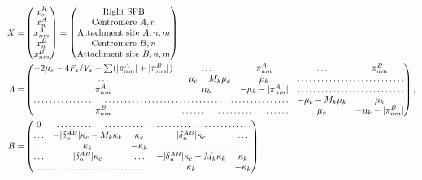 \documentclass[a4paper,12pt]{article}
\begin{document}
\begin{equation}
  \begin{aligned}
    X = &%
    \begin{pmatrix}
      x_s^R\\
      x_n^A\\
      x_{nm}^A\\
      x_n^B\\
      x_{nm}^B\\
    \end{pmatrix} =%
    \begin{pmatrix}
      \text{Right SPB}\\
      \text{Centromere }A, n\\
      \text{Attachment site }A, n,m\\
      \text{Centromere }B, n\\
      \text{Attachment site }B, n,m\\
    \end{pmatrix}\\
    A = &%
    \begin{pmatrix}
      - 2 \mu_s - 4 F_z/V_z - \sum (|\pi_{nm}^A| + |\pi_{nm}^B|)& \hdots & \pi_{nm}^A &%
      \hdots &  \pi_{nm}^B\\
      \hdots &  -\mu_c - M_k \mu_k& \mu_k & \hdotsfor{2}\\
      \pi_{nm}^A & \mu_k & - \mu_k - |\pi_{nm}^A| & \hdotsfor{2}\\
      \hdotsfor{3} & -\mu_c - M_k \mu_k & \mu_k\\
      \pi_{nm}^B & \hdotsfor{2} & \mu_k & - \mu_k - |\pi_{nm}^B| \\
    \end{pmatrix}, \\
    B = &%
    \begin{pmatrix}
      \,0\, & \hdotsfor{4}\\
      \hdots & - |\delta_n^{AB}|\kappa_c - M_k \kappa_k & \kappa_k &%
      |\delta_n^{AB}|\kappa_c & \hdots \\
      \hdots & \kappa_k & -\kappa_k &  \hdotsfor{2}\\
      \hdots & |\delta_n^{AB}|\kappa_c & \hdots &%
      -|\delta_n^{AB}|\kappa_c - M_k \kappa_k & \kappa_k \\
      \hdotsfor{3}  & \kappa_k & - \kappa_k\\
    \end{pmatrix}\\

\end{aligned}
\end{equation}
\end{document}

